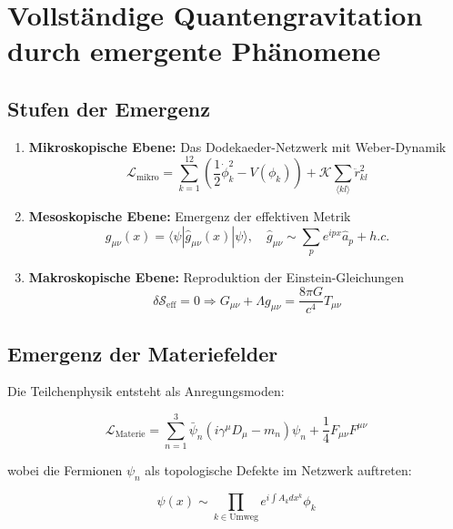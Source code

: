 \section{Vollständige Quantengravitation durch emergente Phänomene}
\subsection{Stufen der Emergenz}

\begin{enumerate}
    \item \textbf{Mikroskopische Ebene:} Das Dodekaeder-Netzwerk mit Weber-Dynamik
    \begin{equation}
        \mathcal{L}_{\text{mikro}} = \sum_{k=1}^{12} \left( \frac{1}{2}\dot{\phi}_k^2 - V(\phi_k) \right) + \mathcal{K} \sum_{\langle kl \rangle} \ddot{r}_{kl}^2
    \end{equation}
    
    \item \textbf{Mesoskopische Ebene:} Emergenz der effektiven Metrik
    \begin{equation}
        g_{\mu\nu}(x) = \langle \psi|\hat{g}_{\mu\nu}(x)|\psi \rangle, \quad \hat{g}_{\mu\nu} \sim \sum_p e^{ipx}\hat{a}_p + h.c.
    \end{equation}
    
    \item \textbf{Makroskopische Ebene:} Reproduktion der Einstein-Gleichungen
    \begin{equation}
        \delta \mathcal{S}_{\text{eff}} = 0 \Rightarrow G_{\mu\nu} + \Lambda g_{\mu\nu} = \frac{8\pi G}{c^4} T_{\mu\nu}
    \end{equation}
\end{enumerate}

\subsection{Emergenz der Materiefelder}
Die Teilchenphysik entsteht als Anregungsmoden:

\begin{equation}
    \mathcal{L}_{\text{Materie}} = \sum_{n=1}^{3} \bar{\psi}_n (i\gamma^\mu D_\mu - m_n)\psi_n + \frac{1}{4} F_{\mu\nu}F^{\mu\nu}
\end{equation}

wobei die Fermionen $\psi_n$ als topologische Defekte im Netzwerk auftreten:

\begin{equation}
    \psi(x) \sim \prod_{k \in \text{Umweg}} e^{i\int A_k dx^k} \phi_k
\end{equation}

